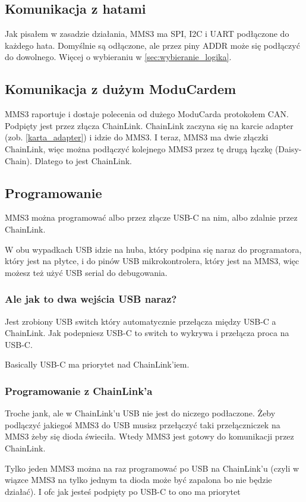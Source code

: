 \documentclass[b5paper, 10pt, twoside]{book}
\begin{document}
\subsection{Komunikacja z hatami}
Jak pisałem w zasadzie działania, MMS3 ma SPI, I2C i UART podłączone do każdego hata. Domyślnie są odłączone, ale przez piny ADDR może się podłączyć do dowolnego. Więcej o wybieraniu w \ref{sec:wybieranie_logika}.

\subsection{Komunikacja z dużym ModuCardem}
MMS3 raportuje i dostaje polecenia od dużego ModuCarda protokołem CAN. Podpięty jest przez złącza ChainLink. ChainLink zaczyna się na karcie adapter (zob. \ref{karta_adapter}) i idzie do MMS3. I teraz, MMS3 ma dwie złączki ChainLink, więc można podłączyć kolejnego MMS3 przez tę drugą łączkę (Daisy-Chain). Dlatego to jest ChainLink.

\subsection{Programowanie}
MMS3 można programować albo przez złącze USB-C na nim, albo zdalnie przez ChainLink.

W obu wypadkach USB idzie na huba, który podpina się naraz do programatora, który jest na płytce, i do pinów USB mikrokontrolera, który jest na MMS3, więc możesz też użyć USB serial do debugowania.

\subsubsection{Ale jak to dwa wejścia USB naraz?}
Jest zrobiony USB switch który automatycznie przełącza między USB-C a ChainLink. Jak podepniesz USB-C to switch to wykrywa i przełącza proca na USB-C.

Basically USB-C ma priorytet nad ChainLink'iem.

\subsubsection{Programowanie z ChainLink'a}
Troche jank, ale w ChainLink'u USB nie jest do niczego podłaczone. Żeby podlączyć jakiegoś MMS3 do USB musisz przełączyć taki przełączniczek na MMS3 żeby się dioda świeciła. Wtedy MMS3 jest gotowy do komunikacji przez ChainLink.

Tylko jeden MMS3 można na raz programować po USB na ChainLink'u (czyli w wiązce MMS3 na tylko jednym
ta dioda może być zapalona bo nie będzie działać). I ofc jak jesteś podpięty po USB-C to ono ma priorytet
\end{document}
